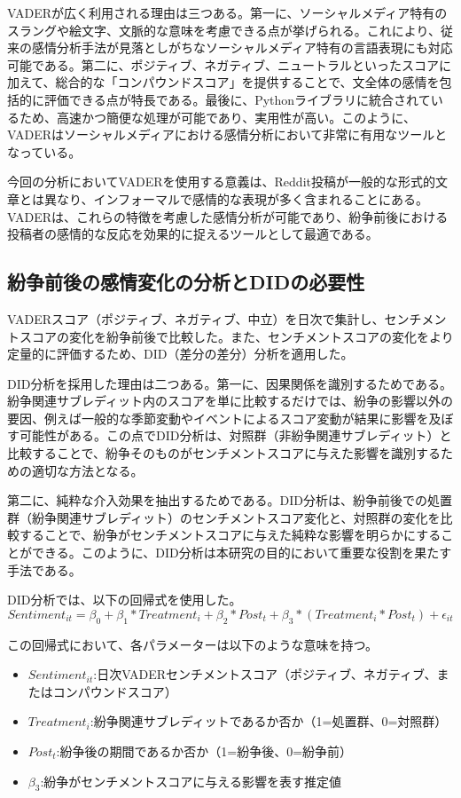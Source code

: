 \documentclass[11pt, a4j]{jreport}
\begin{document}
    VADERが広く利用される理由は三つある。第一に、ソーシャルメディア特有のスラングや絵文字、文脈的な意味を考慮できる点が挙げられる。これにより、従来の感情分析手法が見落としがちなソーシャルメディア特有の言語表現にも対応可能である。第二に、ポジティブ、ネガティブ、ニュートラルといったスコアに加えて、総合的な「コンパウンドスコア」を提供することで、文全体の感情を包括的に評価できる点が特長である。最後に、Pythonライブラリに統合されているため、高速かつ簡便な処理が可能であり、実用性が高い。このように、VADERはソーシャルメディアにおける感情分析において非常に有用なツールとなっている。

    今回の分析においてVADERを使用する意義は、Reddit投稿が一般的な形式的文章とは異なり、インフォーマルで感情的な表現が多く含まれることにある。VADERは、これらの特徴を考慮した感情分析が可能であり、紛争前後における投稿者の感情的な反応を効果的に捉えるツールとして最適である。

    \subsection{紛争前後の感情変化の分析とDIDの必要性}
    VADERスコア（ポジティブ、ネガティブ、中立）を日次で集計し、センチメントスコアの変化を紛争前後で比較した。また、センチメントスコアの変化をより定量的に評価するため、DID（差分の差分）分析を適用した。

    DID分析を採用した理由は二つある。第一に、因果関係を識別するためである。紛争関連サブレディット内のスコアを単に比較するだけでは、紛争の影響以外の要因、例えば一般的な季節変動やイベントによるスコア変動が結果に影響を及ぼす可能性がある。この点でDID分析は、対照群（非紛争関連サブレディット）と比較することで、紛争そのものがセンチメントスコアに与えた影響を識別するための適切な方法となる。
    
    第二に、純粋な介入効果を抽出するためである。DID分析は、紛争前後での処置群（紛争関連サブレディット）のセンチメントスコア変化と、対照群の変化を比較することで、紛争がセンチメントスコアに与えた純粋な影響を明らかにすることができる。このように、DID分析は本研究の目的において重要な役割を果たす手法である。

    DID分析では、以下の回帰式を使用した。
    \begin{equation}
        Sentiment_{it} = \beta_{0} + \beta_{1}*Treatment_{i} + \beta_{2}*Post_{t} + \beta_{3}*(Treatment_{i} * Post_{t}) + \epsilon_{it}
    \end{equation}

    この回帰式において、各パラメーターは以下のような意味を持つ。
    \begin{itemize}
        \item $Sentiment_{it}$:日次VADERセンチメントスコア（ポジティブ、ネガティブ、またはコンパウンドスコア）
        \item $Treatment_{i}$:紛争関連サブレディットであるか否か（1=処置群、0=対照群）
        \item $Post_{t}$:紛争後の期間であるか否か（1=紛争後、0=紛争前）
        \item $\beta_{3}$:紛争がセンチメントスコアに与える影響を表す推定値
    \end{itemize}
\end{document}
